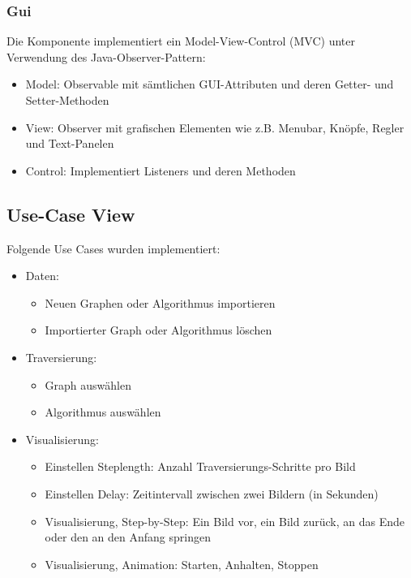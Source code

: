 \subsubsection{Gui}
\label{subsubsec:Gui}
Die Komponente implementiert ein Model-View-Control (MVC) unter Verwendung des Java-Observer-Pattern:
\begin{itemize}
  \item Model: Observable mit s\"amtlichen GUI-Attributen und deren Getter- und Setter-Methoden
  \item View: Observer mit grafischen Elementen wie z.B. Menubar, Kn\"opfe, Regler und Text-Panelen
  \item Control: Implementiert Listeners und deren Methoden
\end{itemize}
% 
\subsection{Use-Case View}
Folgende Use Cases wurden implementiert:
\begin{itemize}
  \item Daten:
  \begin{itemize}
    \item Neuen Graphen oder Algorithmus importieren
    \item Importierter Graph oder Algorithmus l\"oschen
  \end{itemize}
  \item Traversierung:
  \begin{itemize}
    \item Graph ausw\"ahlen
    \item Algorithmus ausw\"ahlen
  \end{itemize}
  \item Visualisierung:
  \begin{itemize}
      \item Einstellen Steplength: Anzahl Traversierungs-Schritte pro Bild
      \item Einstellen Delay: Zeitintervall zwischen zwei Bildern (in Sekunden)      
      \item Visualisierung, Step-by-Step: Ein Bild vor, ein Bild zur\"uck, an das Ende oder den an den Anfang springen
      \item Visualisierung, Animation: Starten, Anhalten, Stoppen
  \end{itemize}
\end{itemize}
% 
